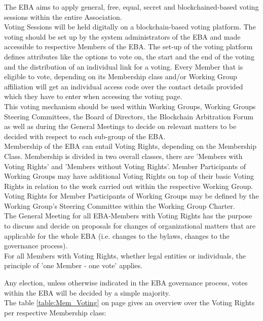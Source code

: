 \documentclass{article}
\begin{document}
The EBA aims to apply general, free, equal, secret and blockchained-based voting sessions within the entire Association. \\
Voting Sessions will be held digitally on a blockchain-based voting platform. 
The voting should be set up by the system administrators of the EBA and made accessible to respective Members of the EBA. 
The set-up of the voting platform defines attributes like the options to vote on, the start and the end of the voting and the distribution of an individual link for a voting. 
Every Member that is eligible to vote, depending on its Membership class and/or Working Group affiliation will get an individual access code over the contact details provided which they have to enter when accessing the voting page. \\
This voting mechanism should be used within Working Groups, Working Groups Steering Committees, the Board of Directors, the Blockchain Arbitration Forum as well as during the General Meetings to decide on relevant matters to be decided with respect to each sub-group of the EBA. \\
Membership of the EBA can entail Voting Rights, depending on the Membership Class. 
Membership is divided in two overall classes, there are 'Members with Voting Rights' and 'Members without Voting Rights'. 
Member Participants of Working Groups may have additional Voting Rights on top of their basic Voting Rights in relation to the work carried out within the respective Working Group. 
Voting Rights for Member Participants of Working Groups may be defined by the Working Group's Steering Committee within the Working Group Charter. \\
The General Meeting for all EBA-Members with Voting Rights has the purpose to discuss and decide on proposals for changes of organizational matters that are applicable for the whole EBA (i.e. changes to the bylaws, changes to the governance process). \\
For all Members with Voting Rights, whether legal entities or individuals, the principle of 'one Member - one vote' applies.

Any election, unless otherwise indicated in the EBA governance process, votes within the EBA will be decided by a simple majority. \\
The table \ref{table:Mem_Voting} on page \pageref{table:Mem_Voting} gives an overview over the Voting Rights per respective Membership class: \\
\end{document}

